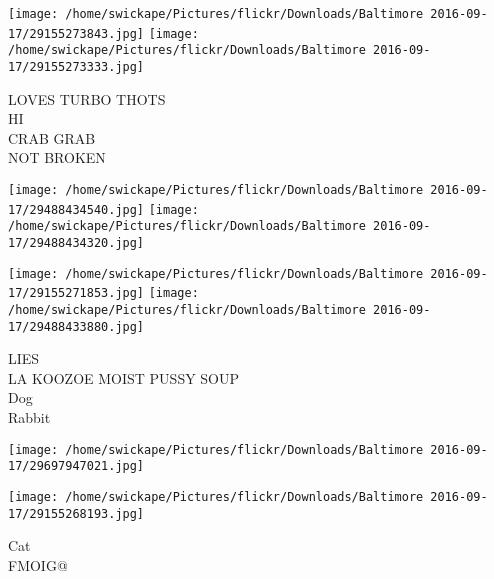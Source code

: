 \documentclass[10pt,letterpaper]{article}
\begin{document}
\texttt{[image: /home/swickape/Pictures/flickr/Downloads/Baltimore 2016-09-17/29155273843.jpg]}
\texttt{[image: /home/swickape/Pictures/flickr/Downloads/Baltimore 2016-09-17/29155273333.jpg]}

LOVES TURBO THOTS\\
HI\\
CRAB GRAB\\
NOT BROKEN
\pagebreak

\texttt{[image: /home/swickape/Pictures/flickr/Downloads/Baltimore 2016-09-17/29488434540.jpg]}
\texttt{[image: /home/swickape/Pictures/flickr/Downloads/Baltimore 2016-09-17/29488434320.jpg]}

\texttt{[image: /home/swickape/Pictures/flickr/Downloads/Baltimore 2016-09-17/29155271853.jpg]}
\texttt{[image: /home/swickape/Pictures/flickr/Downloads/Baltimore 2016-09-17/29488433880.jpg]}

LIES\\
LA KOOZOE MOIST PUSSY SOUP\\
Dog\\
Rabbit
\pagebreak

\texttt{[image: /home/swickape/Pictures/flickr/Downloads/Baltimore 2016-09-17/29697947021.jpg]}

\vspace{0.25in}
\texttt{[image: /home/swickape/Pictures/flickr/Downloads/Baltimore 2016-09-17/29155268193.jpg]}

Cat\\
FMOIG@
\pagebreak
\end{document}
